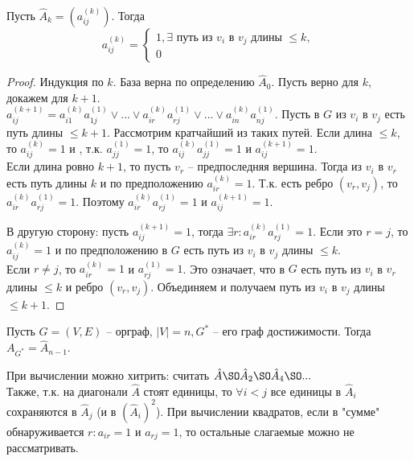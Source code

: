 	\begin{Lm}
		Пусть $\hat{A}_k = \left(a_{ij}^{(k)}\right)$. Тогда 
		\[a_{ij}^{(k)} = \begin{cases}
			1, \exists \text{ путь из } v_i \text{ в } v_j \text{ длины } \leqslant k, \\
			0
		\end{cases}\]
	\end{Lm}

	\begin{proof}
		Индукция по $k$. База верна по определению $\hat{A}_0$. 
		Пусть верно для $k$, докажем для $k + 1$. \\
		$a_{ij}^{(k + 1)} = a_{i1}^{(k)} a_{1j}^{(1)} \vee ... \vee a_{ir}^{(k)}a_{rj}^{(1)} \vee ... \vee a_{in}^{(k)} a_{nj}^{(1)}$. Пусть в $G$ из $v_i$ в $v_j$ есть путь 
		длины $\leqslant k + 1$. Рассмотрим кратчайший из таких путей. Если длина $\leqslant k$, то $a_{ij}^{(k)} = 1$ и , т.к. $a_{jj}^{(1)} = 1$, то $a_{ij}^{(k)} a_{jj}^{(1)} = 1$ и $a_{ij}^{(k + 1)} = 1$. \\
		Если длина ровно $k + 1$, то пусть $v_r$ -- предпоследняя вершина. Тогда из $v_i$ в $v_r$ есть путь длины $k$ и по предположению $a_{ir}^{(k)} = 1$. Т.к. есть ребро $(v_r, v_j)$, то $a_{ir}^{(k)} a_{rj}^{(1)} = 1$.
		Поэтому $a_{ir}^{(k)} a_{rj}^{(1)} = 1$ и $a_{ij}^{(k + 1)} = 1$.
		
		В другую сторону: пусть $a_{ij}^{(k + 1)} = 1$, тогда $\exists r : a_{ir}^{(k)}a_{rj}^{(1)} = 1$.
		Если это $r = j$, то $a_{ij}^{(k)} = 1$ и по предположению в $G$ есть путь из $v_i$ в $v_j$ длины $\leqslant k$. \\
		Если $r \neq j$, то $a_{ir}^{(k)} = 1$ и $a_{rj}^{(1)} = 1$. Это означает, что в $G$ есть путь из $v_i$ в $v_r$ длины $\leqslant k$ и ребро $(v_r, v_j)$. Объединяем и получаем путь из $v_i$ в $v_j$ длины $\leqslant k + 1$.
	\end{proof}

	\begin{Cons}
		Пусть $G = (V, E)$ -- орграф, $|V| = n, G^*$ -- его граф достижимости. Тогда $A_{G^*} = \hat{A}_{n - 1}$. 
	\end{Cons}

	\begin{Rem}
		При вычислении можно хитрить: считать $\hat{A} \SO \hat{A}_2 \SO \hat{A}_4 \SO ...$ \\
		Также, т.к. на диагонали $\hat{A}$ стоят единицы, то $\forall i < j$ все единицы в $\hat{A}_i$ сохраняются в $\hat{A}_j$ (и в $(\hat{A}_i)^2$). 
		При вычислении квадратов, если в "сумме" обнаруживается $r : a_{ir} = 1$ и $a_{rj} = 1$, то остальные слагаемые можно не рассматривать.  
	\end{Rem}

